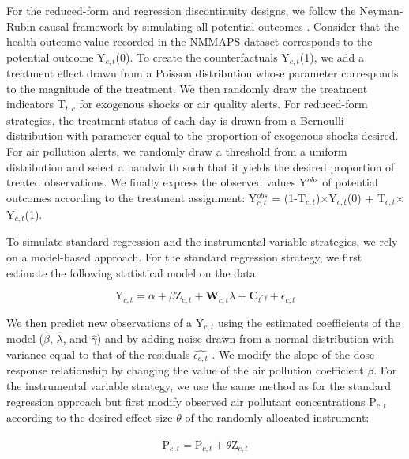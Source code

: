 \documentclass[12pt]{article}
\begin{document}
        \begin{sloppypar}
        For the reduced-form and regression discontinuity designs, we follow the Neyman-Rubin causal framework by simulating all potential outcomes \citep{rubin_estimating_1974}. Consider that the health outcome value recorded in the NMMAPS dataset corresponds to the potential outcome Y$_{c,t}$(0). To create the counterfactuals Y$_{c,t}$(1), we add a treatment effect drawn from a Poisson distribution whose parameter corresponds to the magnitude of the treatment. We then randomly draw the treatment indicators T$_{t,c}$ for exogenous shocks or air quality alerts. For reduced-form strategies, the treatment status of each day is drawn from a Bernoulli distribution with parameter equal to the proportion of exogenous shocks desired. For air pollution alerts, we randomly draw a threshold from a uniform distribution and select a bandwidth such that it yields the desired proportion of treated observations. We finally express the observed values Y$^{obs}$ of potential outcomes according to the treatment assignment: Y$^{obs}_{c,t}$ = (1-T$_{c,t}$)$\times$Y$_{c,t}$(0) + T$_{c,t}$$\times$Y$_{c,t}$(1).
        \end{sloppypar}
      
        To simulate standard regression and the instrumental variable strategies, we rely on a model-based approach. For the standard regression strategy, we first estimate the following statistical model on the data:
        
        \begin{equation*}
        \text{Y}_{c,t} = \alpha + \beta\text{Z}_{c,t} + \textbf{W}_{c,t}\lambda + \textbf{C}_{t}\gamma + \epsilon_{c,t}
        \end{equation*}
        
        \noindent We then predict new observations of a $\text{Y}_{c,t}$ using the estimated coefficients of the model ($\hat{\beta}$, $\hat{\lambda}$, and $\hat{\gamma}$) and by adding noise drawn from a normal distribution with variance equal to that of the residuals $\widehat{\epsilon_{c,t}}$ \citep{peng2006model}. We modify the slope of the dose-response relationship by changing the value of the air pollution coefficient $\beta$. For the instrumental variable strategy, we use the same method as for the standard regression approach but first modify observed air pollutant concentrations $\text{P}_{c,t}$ according to the desired effect size $\theta$ of the randomly allocated instrument: 
        
        \begin{equation*}
        \widetilde{\text{P}}_{c,t} = \text{P}_{c,t} + \theta\text{Z}_{c,t}
        \end{equation*}
        
\end{document}
